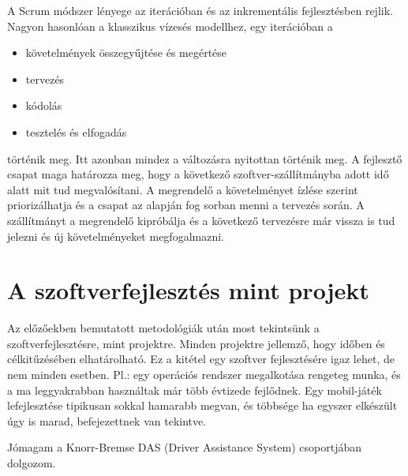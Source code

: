 \documentclass[a4paper,12pt,leqno, notitlepage]{article}%
\begin{document}
A Scrum módszer lényege az iterációban és az inkrementális fejlesztésben rejlik. Nagyon hasonlóan a klasszikus vízesés modellhez, egy iterációban a 
\begin{itemize}
	\item követelmények összegyűjtése és megértése
	\item tervezés
	\item kódolás
	\item tesztelés és elfogadás
\end{itemize}
történik meg. Itt azonban mindez a változásra nyitottan történik meg. A fejlesztő csapat maga határozza meg, hogy a következő szoftver-szállítmányba adott idő alatt mit tud megvalósítani. A megrendelő a követelményet ízlése szerint priorizálhatja és a csapat az alapján fog sorban menni  a tervezés során. A szállítmányt a megrendelő kipróbálja és a következő tervezésre már vissza is tud jelezni és új követelményeket megfogalmazni.

\section{A szoftver\-fejlesztés mint projekt}

Az előzőekben bemutatott metodológiák után most tekintsünk a szoftverfejlesztésre, mint projektre. Minden projektre jellemző, hogy időben és célkitűzésében elhatárolható. Ez a kitétel egy szoftver fejlesztésére igaz lehet, de nem minden esetben. Pl.: egy operációs rendszer megalkotása rengeteg munka, és a ma leggyakrabban használtak már több évtizede fejlődnek. Egy mobil-játék lefejlesztése tipikusan sokkal hamarabb megvan, és többsége ha egyszer elkészült úgy is marad, befejezettnek van tekintve.

Jómagam a Knorr-Bremse DAS (Driver Assistance System) csoportjában dolgozom.

{}

\end{document}
